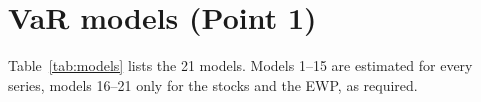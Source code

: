 \section{VaR models (Point 1)}\label{sec:models}

Table~\ref{tab:models} lists the 21 models. Models 1--15 are estimated for every series, models 16--21 only for the
stocks and the EWP, as required.
